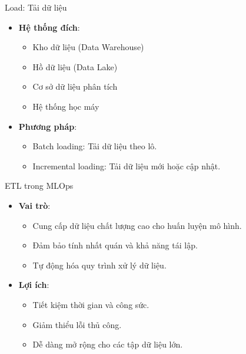 \documentclass{beamer}
\begin{document}
\begin{frame}{Load: Tải dữ liệu}
    \begin{itemize}
        \item \textbf{Hệ thống đích}:
        \begin{itemize}
            \item Kho dữ liệu (Data Warehouse)
            \item Hồ dữ liệu (Data Lake)
            \item Cơ sở dữ liệu phân tích
            \item Hệ thống học máy
        \end{itemize}
        \item \textbf{Phương pháp}:
        \begin{itemize}
            \item Batch loading: Tải dữ liệu theo lô.
            \item Incremental loading: Tải dữ liệu mới hoặc cập nhật.
        \end{itemize}
    \end{itemize}
\end{frame}

\begin{frame}{ETL trong MLOps}
    \begin{itemize}
        \item \textbf{Vai trò}:
        \begin{itemize}
            \item Cung cấp dữ liệu chất lượng cao cho huấn luyện mô hình.
            \item Đảm bảo tính nhất quán và khả năng tái lập.
            \item Tự động hóa quy trình xử lý dữ liệu.
        \end{itemize}
        \item \textbf{Lợi ích}:
        \begin{itemize}
            \item Tiết kiệm thời gian và công sức.
            \item Giảm thiểu lỗi thủ công.
            \item Dễ dàng mở rộng cho các tập dữ liệu lớn.
        \end{itemize}
    \end{itemize}
\end{frame}
\end{document}
